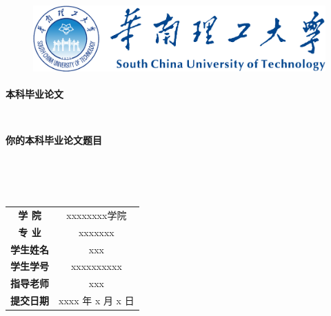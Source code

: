 \thispagestyle{empty}
\begin{figure}[ht]
\centering
\includegraphics[height=2.75cm]{images/scutlogo.pdf}
\end{figure}
\begin{center}
\textbf{本科毕业论文}
\end{center}
\nopagebreak[4]
\begin{center}
\ \\
\end{center}
\nopagebreak[4]
\begin{center}
\textbf{你的本科毕业论文题目}
\end{center}
\nopagebreak[4]
\begin{center}
\ \\\ \\\ \\
\end{center}
\nopagebreak[4]
\begin{spacing}{1.8}
\begin{center}
 \begin{tabular}{c @{ : } c }
 	\textbf{学 \quad\quad 院} & xxxxxxxx学院 \\ \cline{2-2}
 	\textbf{专 \quad\quad 业} & xxxxxxx \\ \cline{2-2}
 	\textbf{学生姓名} & xxx  \\ \cline{2-2}
 	\textbf{学生学号} & xxxxxxxxxx  \\ \cline{2-2}
 	\textbf{指导老师} & xxx	 \\ \cline{2-2}
 	\textbf{提交日期} & xxxx 年 x 月 x 日 \\ \cline{2-2}
 \end{tabular}
\end{center}
\end{spacing}
\pagebreak[4]